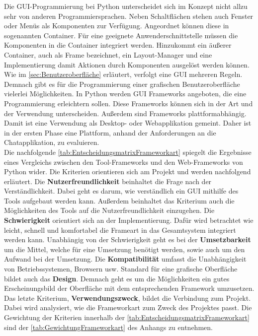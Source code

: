 \documentclass[a4paper,titlepage,halfparskip,12pt]{scrreprt}
\begin{document}
\begin{onehalfspacing}
Die \ac{GUI}-Programmierung bei Python unterscheidet sich im Konzept nicht allzu sehr von anderen Programmiersprachen. Neben Schaltflächen stehen auch Fenster oder Menüs als Komponenten zur Verfügung. Angeordnet können diese in sogenannten Container. Für eine geeignete Anwenderschnittstelle müssen die Komponenten in die Container integriert werden. Hinzukommt ein äußerer Container, auch als Frame bezeichnet, ein Layout-Manager und eine Implementierung damit Aktionen durch Komponenten ausgelöst werden können. Wie im \autoref{sec:Benutzeroberfläche} erläutert, verfolgt eine \ac{GUI} mehreren Regeln. Demnach gibt es für die Programmierung einer grafischen Benutzeroberfläche vielerlei Möglichkeiten. In Python werden \ac{GUI} Frameworks angeboten, die eine Programmierung erleichtern sollen. Diese Frameworks können sich in der Art und der Verwendung unterscheiden. Außerdem sind Frameworks plattformabhängig. Damit ist eine Verwendung als Desktop- oder Webapplikation gemeint. Daher ist in der ersten Phase eine Plattform, anhand der Anforderungen an die Chatapplikation, zu evaluieren.\cite{Steyer2018} \\
Die nachfolgende \autoref{tab:EntscheidungsmatrixFrameworkart} spiegelt die Ergebnisse eines Vergleichs zwischen den Tool-Frameworks und den Web-Frameworks von Python wider. Die Kriterien orientieren sich am Projekt und werden nachfolgend erläutert. Die \textbf{Nutzerfreundlichkeit} beinhaltet die Frage nach der Verständlichkeit. Dabei geht es darum, wie verständlich ein GUI mithilfe des Tools aufgebaut werden kann. Außerdem beinhaltet das Kriterium auch die Möglichkeiten des Tools auf die Nutzerfreundlichkeit einzugehen. Die \textbf{Schwierigkeit} orientiert sich an der Implementierung. Dafür wird betrachtet wie leicht, schnell und komfortabel die Frameart in das Gesamtsystem integriert werden kann. Unabhängig von der Schwierigkeit geht es bei der \textbf{Umsetzbarkeit} um die Mittel, welche für eine Umsetzung benötigt werden, sowie auch um den Aufwand bei der Umsetzung. Die \textbf{Kompatibilität} umfasst die Unabhängigkeit von Betriebssystemen, Browsern usw. Standard für eine grafische Oberfläche bildet auch das \textbf{Design}. Demnach geht es um die Möglichkeiten ein gutes Erscheinungsbild der Oberfläche mit dem entsprechenden Framework umzusetzen. Das letzte Kriterium, \textbf{Verwendungszweck}, bildet die Verbindung zum Projekt. Dabei wird analysiert, wie die Frameworkart zum Zweck des Projektes passt. Die Gewichtung der Kriterien innerhalb der \autoref{tab:EntscheidungsmatrixFrameworkart} sind der \autoref{tab:GewichtungFrameworkart} des Anhangs zu entnehmen.

\end{onehalfspacing}
\end{document}
